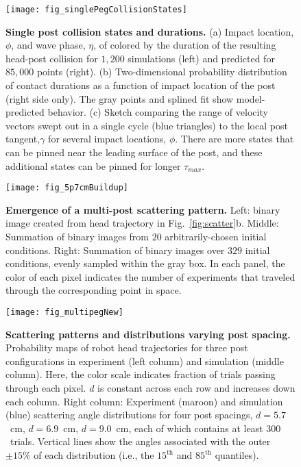 \documentclass[aps,pre,twocolumn,superscriptaddress]{revtex4-1}
\begin{document}
\begin{figure}[ht!]
	\texttt{[image: fig\_singlePegCollisionStates]}
	\caption{\textbf{Single post collision states and durations.} (a) Impact location, $\phi$, and wave phase, $\eta$, of  colored by the duration of the resulting head-post collision for $1,200$ simulations (left)  and predicted for $85,000$ points (right). (b) Two-dimensional probability distribution of contact durations as a function of impact location of the post (right side only). The gray points and splined fit show model-predicted behavior. (c) Sketch comparing the range of velocity vectors swept out in a single cycle (blue triangles) to the local post tangent,$\gamma$ for several impact locations, $\phi$. There are more states that can be pinned near the leading surface of the post, and these additional states can be pinned for longer $\tau_{max}$.}
	\label{fig:singlepoststates}
\end{figure}


\begin{figure*}[ht!]
	\texttt{[image: fig\_5p7cmBuildup]}
	\caption{\textbf{Emergence of a multi-post scattering pattern.}  Left: binary image created from head trajectory in Fig.~\ref{fig:scatter}b. Middle: Summation of binary images from $20$ arbitrarily-chosen initial conditions. Right: Summation of binary images over $329$ initial conditions, evenly sampled within the gray box. In each panel, the color of each pixel indicates the number of experiments that traveled through the corresponding point in space.}
	\label{fig:multiBuildup}
\end{figure*}

\begin{figure}[ht!]
	\texttt{[image: fig\_multipegNew]}
	\caption{\textbf{Scattering patterns and distributions varying post spacing.} Probability maps of robot head trajectories for three post configurations in  experiment (left column) and simulation (middle column). Here, the color scale indicates fraction of trials passing through each pixel. $d$ is constant across each row and increases down each column. Right column: Experiment (maroon) and simulation (blue) scattering angle distributions for four post spacings, $d = 5.7$~cm, $d = 6.9$~cm, $d = 9.0$~cm, each of which contains at least $300$~trials. Vertical lines show the angles associated with the outer $\pm15\%$ of each distribution (i.e., the $15^{\mathrm{th}}$ and $85^{\mathrm{th}}$ quantiles).}
	\label{fig:preferredPaths}
\end{figure}
\end{document}
